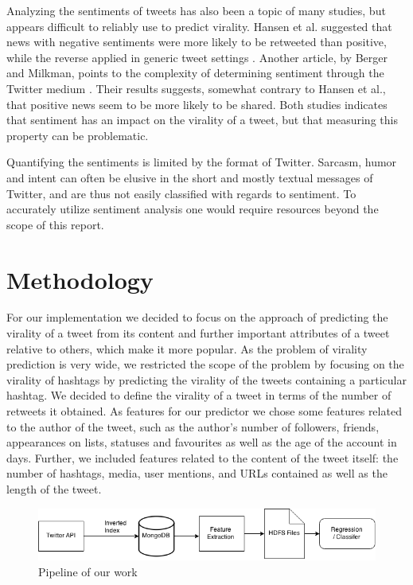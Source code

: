 Analyzing the sentiments of tweets has also been a topic of many studies, but appears difficult to reliably use to predict virality.
Hansen et al. suggested that news with negative sentiments were more likely to be retweeted than positive, while the reverse applied in generic tweet settings \cite{hansen11}.
Another article, by Berger and Milkman, points to the complexity of determining sentiment through the Twitter medium \cite{berger12}.
Their results suggests, somewhat contrary to Hansen et al., that positive news seem to be more likely to be shared.
Both studies indicates that sentiment has an impact on the virality of a tweet, but that measuring this property can be problematic.

Quantifying the sentiments is limited by the format of Twitter.
Sarcasm, humor and intent can often be elusive in the short and mostly textual messages of Twitter, and are thus not easily classified with regards to sentiment.
To accurately utilize sentiment analysis one would require resources beyond the scope of this report.






\section{Methodology}


For our implementation we decided to focus on the approach of predicting the virality of a tweet from its content and further important attributes of a tweet relative to others, which make it more popular. As the problem of virality prediction is very wide, we restricted the scope of the problem by focusing on the virality of hashtags by predicting the virality of the tweets containing a particular hashtag. We decided to define the virality of a tweet in terms of the number of retweets it obtained. As features for our predictor we chose some features related to the author of the tweet, such as the author's number of followers, friends, appearances on lists, statuses and favourites as well as the age of the account in days. Further, we included features related to the content of the tweet itself: the number of hashtags, media, user mentions, and URLs contained as well as the length of the tweet. 

\begin{figure}[H]
\centering
\includegraphics[width=0.7\linewidth]{img/pipeline.png}
\caption{Pipeline of our work}
\label{fig:pipeline}
\end{figure}



